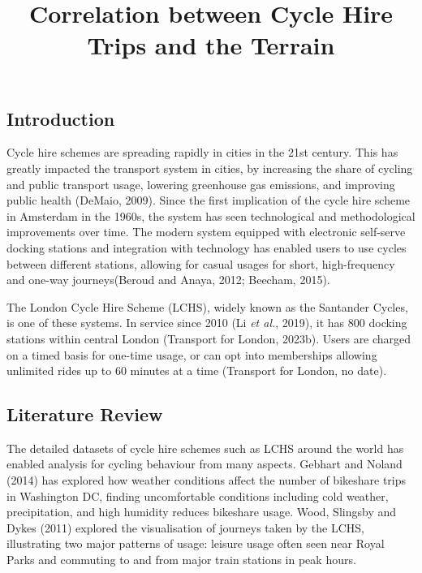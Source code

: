 \documentclass[
  a4paper,
  DIV=11,
  numbers=noendperiod]{scrartcl}
\title{Correlation between Cycle Hire Trips and the Terrain}
\author{}
\date{}
\begin{document}
\maketitle
\ifdefined\Shaded\renewenvironment{Shaded}{\begin{tcolorbox}[enhanced, breakable, borderline west={3pt}{0pt}{shadecolor}, interior hidden, sharp corners, frame hidden, boxrule=0pt]}{\end{tcolorbox}}\fi

\hypertarget{introduction}{%
\subsection{Introduction}\label{introduction}}

Cycle hire schemes are spreading rapidly in cities in the 21st century.
This has greatly impacted the transport system in cities, by increasing
the share of cycling and public transport usage, lowering greenhouse gas
emissions, and improving public health (DeMaio, 2009). Since the first
implication of the cycle hire scheme in Amsterdam in the 1960s, the
system has seen technological and methodological improvements over time.
The modern system equipped with electronic self-serve docking stations
and integration with technology has enabled users to use cycles between
different stations, allowing for casual usages for short, high-frequency
and one-way journeys(Beroud and Anaya, 2012; Beecham, 2015).

The London Cycle Hire Scheme (LCHS), widely known as the Santander
Cycles, is one of these systems. In service since 2010 (Li \emph{et
al.}, 2019), it has 800 docking stations within central London
(Transport for London, 2023b). Users are charged on a timed basis for
one-time usage, or can opt into memberships allowing unlimited rides up
to 60 minutes at a time (Transport for London, no date).

\hypertarget{literature-review}{%
\subsection{Literature Review}\label{literature-review}}

The detailed datasets of cycle hire schemes such as LCHS around the
world has enabled analysis for cycling behaviour from many aspects.
Gebhart and Noland (2014) has explored how weather conditions affect the
number of bikeshare trips in Washington DC, finding uncomfortable
conditions including cold weather, precipitation, and high humidity
reduces bikeshare usage. Wood, Slingsby and Dykes (2011) explored the
visualisation of journeys taken by the LCHS, illustrating two major
patterns of usage: leisure usage often seen near Royal Parks and
commuting to and from major train stations in peak hours.
\end{document}
